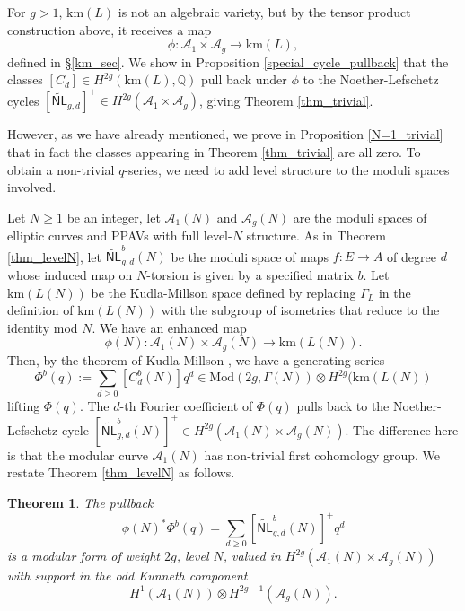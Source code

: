 \documentclass[12pt]{amsart}
\def\cA{\mathcal{A}}
\def\bC{\mathbb{C}}
\def\bQ{\mathbb{Q}}
\DeclareMathOperator{\Cusp}{Cusp}
\newcommand{\A}{\mathcal A}
\newcommand{\Mod}{\mathrm{Mod}}
\newcommand{\wNL}{{\widetilde{\mathsf{NL}}}}
\newcommand{\km}{\mathrm{km}}
\newtheorem{thm}{Theorem}[section]
\theoremstyle{definition}
\begin{document}
For $g>1$, $\km(L)$ is not an algebraic variety, but by the tensor product construction above, it receives a map
\begin{equation*}
\phi: \A_1\times \A_g \to \km(L),
\end{equation*}
defined in \S\ref{km_sec}. We show in Proposition \ref{special_cycle_pullback} that the classes $[C_d]\in H^{2g}(\km(L),\bQ)$ pull back under $\phi$ to the Noether-Lefschetz cycles $[\wNL_{g,d}]^+\in H^{2g}(\cA_1\times \cA_g)$, giving Theorem \ref{thm_trivial}.

However, as we have already mentioned, we prove in Proposition \ref{N=1_trivial} that in fact the classes appearing in Theorem \ref{thm_trivial} are all zero. To obtain a non-trivial $q$-series, we need to add level structure to the moduli spaces involved. 

Let $N\ge 1$ be an integer, let $\cA_1(N)$ and $\cA_g(N)$ are the moduli spaces of elliptic curves and PPAVs with full level-$N$ structure. As in Theorem \ref{thm_levelN}, let $\wNL^b_{g,d}(N)$ be the moduli space of maps $f:E\to A$ of degree $d$ whose induced map on $N$-torsion is given by a specified matrix $b$. Let $\km(L(N))$ be the Kudla-Millson space defined by replacing $\Gamma_L$ in the definition of $\km(L(N))$ with the subgroup of isometries that reduce to the identity mod $N$. We have an enhanced map
\begin{equation*}
\phi(N): \A_1(N)\times \A_g(N) \to \km(L(N)).
\end{equation*}
Then, by the theorem of Kudla-Millson \cite{km}, we have a generating series
\begin{equation*}
    \Phi^{b}(q):=\sum_{d\ge0}[C^b_d(N)]q^d \in \Mod(2g,\Gamma(N))\otimes H^{2g}(\km(L(N))
\end{equation*}
lifting $\Phi(q)$. The $d$-th Fourier coefficient of $\Phi(q)$ pulls back to the Noether-Lefschetz cycle $[\wNL^b_{g,d}(N)]^+\in H^{2g}(\cA_1(N)\times\cA_g(N))$. The difference here is that the modular curve $\A_1(N)$ has non-trivial first cohomology group. We restate Theorem \ref{thm_levelN} as follows.
\begin{thm}
    The pullback 
    \begin{equation*}
        \phi(N)^* \Phi^{b}(q)=\sum_{d\ge 0}[\wNL^b_{g,d}(N)]^+q^d
    \end{equation*}
    is a modular form of weight $2g$, level $N$, valued in $H^{2g}(\A_1(N)\times \A_g(N))$ with support in the odd Kunneth component
    $$H^1(\A_1(N))\otimes H^{2g-1}(\A_g(N)).$$
\end{thm}
\end{document}
